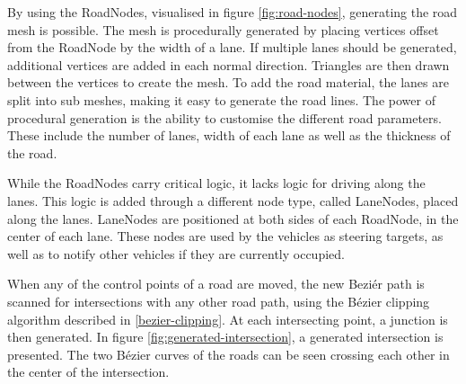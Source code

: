        By using the RoadNodes, visualised in figure \ref{fig:road-nodes}, generating the road mesh is possible. The mesh is procedurally generated by placing vertices offset from the RoadNode by the width of a lane. If multiple lanes should be generated, additional vertices are added in each normal direction. Triangles are then drawn between the vertices to create the mesh. To add the road material, the lanes are split into sub meshes, making it easy to generate the road lines. The power of procedural generation is the ability to customise the different road parameters. These include the number of lanes, width of each lane as well as the thickness of the road.

        While the RoadNodes carry critical logic, it lacks logic for driving along the lanes. This logic is added through a different node type, called LaneNodes, placed along the lanes. LaneNodes are positioned at both sides of each RoadNode, in the center of each lane. These nodes are used by the vehicles as steering targets, as well as to notify other vehicles if they are currently occupied.

        When any of the control points of a road are moved, the new Beziér path is scanned for intersections with any other road path, using the Bézier clipping algorithm described in \ref{bezier-clipping}. At each intersecting point, a junction is then generated. In figure \ref{fig:generated-intersection}, a generated intersection is presented. The two Bézier curves of the roads can be seen crossing each other in the center of the intersection.

